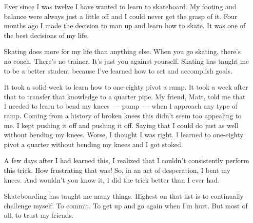 Ever since I was twelve I have wanted to learn to skateboard. My footing and balance were always just a little off and I could never get the grasp of it. Four months ago I made the decision to man up and learn how to skate. It was one of the best decisions of my life.

Skating does more for my life than anything else. When you go skating, there's no coach. There's no trainer. It's just you against yourself. Skating has taught me to be a better student because I've learned how to set and accomplish goals.

It took a solid week to learn how to one-eighty pivot a ramp. It took a week after that to transfer that knowledge to a quarter pipe. My friend, Matt, told me that I needed to learn to bend my knees~--- pump~--- when I approach any type of ramp. Coming from a history of broken knees this didn't seem too appealing to me. I kept pushing it off and pushing it off. Saying that I could do just as well without bending my knees. Worse, I thought I was right. I learned to one-eighty pivot a quarter without bending my knees and I got stoked.

A few days after I had learned this, I realized that I couldn't consistently perform this trick. How frustrating that was! So, in an act of desperation, I bent my knees. And wouldn't you know it, I did the trick better than I ever had.

Skateboarding has taught me many things. Highest on that list is to continually challenge myself. To commit. To get up and go again when I'm hurt. But most of all, to trust my friends.
